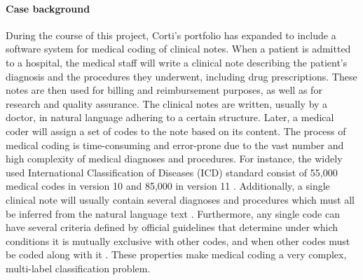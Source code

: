 \paragraph{Case background} During the course of this project, Corti's portfolio has expanded to include a software system for medical coding of clinical notes. 
When a patient is admitted to a hospital, the medical staff will write a clinical note describing the patient's diagnosis and the procedures they underwent, including drug prescriptions. 
These notes are then used for billing and reimbursement purposes, as well as for research and quality assurance. 
The clinical notes are written, usually by a doctor, in natural language adhering to a certain structure. Later, a medical coder will assign a set of codes to the note based on its content. 
The process of medical coding is time-consuming and error-prone due to the vast number and high complexity of medical diagnoses and procedures. For instance, the widely used International Classification of Diseases (ICD) standard consist of 55,000 medical codes in version 10 and 85,000 in version 11 \parencite{worldhealthorganisationwho_international_2023}. Additionally, a single clinical note will usually contain several diagnoses and procedures which must all be inferred from the natural language text \parencite{johnsonMIMICIIIFreelyAccessible2016,johnsonMIMICIVFreelyAccessible2023}. 
Furthermore, any single code can have several criteria defined by official guidelines that determine under which conditions it is mutually exclusive with other codes, and when other codes must be coded along with it \parencite{centersformedicaremedicaidservicesus_icd10cm_2023}. These properties make medical coding a very complex, multi-label classification problem. 

